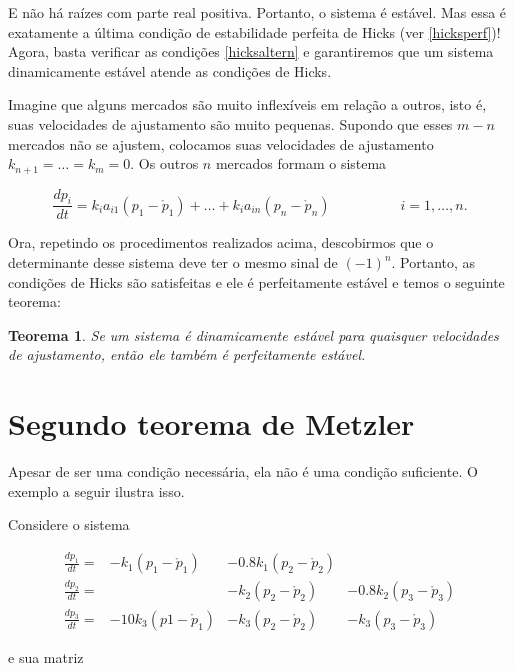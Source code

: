 \documentclass[
	12pt,				%
	openright,			%
	twoside,			%
	a4paper,			%
	english,			%
	french,				%
	spanish,			%
	brazil				%
	]{abntex2}
\newtheorem{teorema}{Teorema}[chapter]
\newcommand{\espaco}{\hspace{5em}}
\newcommand{\pbola}{\mathring{p}}
\begin{document}
E não há raízes com parte real positiva. Portanto, o sistema é estável.
Mas essa é exatamente a última condição de estabilidade perfeita de Hicks (ver \ref{hicksperf})!
Agora, basta verificar as condições \ref{hicksaltern} e garantiremos que um sistema dinamicamente estável
atende as condições de Hicks.

Imagine que alguns mercados são muito inflexíveis em relação a outros, isto é,
suas velocidades de ajustamento são muito pequenas. Supondo que esses $m-n$ mercados não se ajustem, colocamos
suas velocidades de ajustamento $k_{n+1} = \ldots = k_m = 0$. Os outros $n$ mercados formam o sistema

\begin{equation} \label{sistn}
		\frac{dp_i}{dt} = k_ia_{i1}(p_1 - \pbola_1) + \ldots + k_ia_{in}(p_n - \pbola_n) \espaco i = 1, \ldots, n.
\end{equation}

Ora, repetindo os procedimentos realizados acima, descobirmos que o determinante desse
sistema deve ter o mesmo sinal de $(-1)^n$. Portanto, as condições de Hicks são satisfeitas
e ele é perfeitamente estável e temos o seguinte teorema:

\begin{teorema} \label{metzler1}
	Se um sistema é dinamicamente estável para quaisquer velocidades de ajustamento,
	então ele também é perfeitamente estável.
\end{teorema}

\section{Segundo teorema de Metzler}

Apesar de ser uma condição necessária, ela não é uma condição suficiente. O exemplo
a seguir ilustra isso.

Considere o sistema

\begin{equation}
	\begin{matrix}
		\frac{dp_1}{dt} =& -k_1(p_1 - \pbola_1) &- 0.8k_1(p_2 - \pbola_2) & \\
		\frac{dp_2}{dt} =&                      &- k_2(p_2 - \pbola_2)    &- 0.8k_2(p_3 - \pbola_3) \\
		\frac{dp_3}{dt} =& -10k_3(p1 - \pbola_1)&- k_3(p_2 - \pbola_2)   &- k_3(p_3 - \pbola_3)
	\end{matrix}
\end{equation}

e sua matriz
\end{document}
